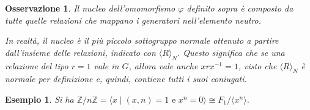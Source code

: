 \documentclass[11pt]{scrartcl}
\theoremstyle{style1}
\newtheorem{osservazione}{Osservazione}[section]
\newtheorem{esempio}{Esempio}[section]
\numberwithin{equation}{subsection}
\begin{document}
\begin{osservazione}
Il nucleo dell'omomorfismo $\varphi $ definito sopra \`e composto da tutte quelle relazioni che mappano i generatori nell'elemento neutro.

In realt\`a, il nucleo \`e il pi\`u piccolo sottogruppo normale ottenuto a partire dall'insieme delle relazioni, indicato con $\langle R \rangle_N$.
Questo significa che se una relazione del tipo $r = 1$ vale in $G$, allora vale anche $xrx^{-1}=1$, visto che $\langle R \rangle_N$ \`e normale per definizione e, quindi, contiene tutti i suoi coniugati.
\end{osservazione}
\begin{esempio}
Si ha $\mathbb{Z} / n\mathbb{Z} = \langle x  \mid (x,n) = 1 \text{ e } x^n = 0 \rangle\cong F_1 / \langle x^n \rangle$.
\end{esempio}
\end{document}
